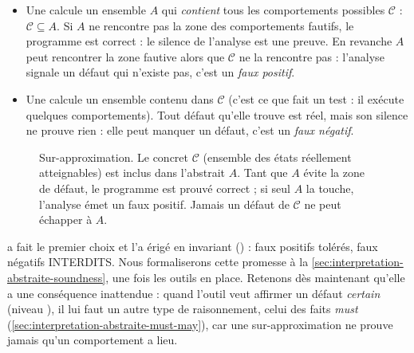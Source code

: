 \begin{itemize}
  \item Une  calcule un ensemble $A$ qui
    \emph{contient} tous les comportements possibles $\mathcal{C}$ :
    $\mathcal{C} \subseteq A$. Si $A$ ne rencontre pas la zone des
    comportements fautifs, le programme est correct : le silence de l'analyse
    est une preuve. En revanche $A$ peut rencontrer la zone fautive alors que
    $\mathcal{C}$ ne la rencontre pas : l'analyse signale un défaut qui n'existe
    pas, c'est un \emph{faux positif}.
  \item Une  calcule un ensemble contenu dans
    $\mathcal{C}$ (c'est ce que fait un test : il exécute quelques
    comportements). Tout défaut qu'elle trouve est réel, mais son silence ne
    prouve rien : elle peut manquer un défaut, c'est un \emph{faux négatif}.
\end{itemize}

\begin{figure}[htbp]\centering
{}
\caption{Sur-approximation. Le concret $\mathcal{C}$ (ensemble des états
réellement atteignables) est inclus dans l'abstrait $A$. Tant que $A$ évite la
zone de défaut, le programme est prouvé correct ; si seul $A$ la touche,
l'analyse émet un faux positif. Jamais un défaut de $\mathcal{C}$ ne peut
échapper à $A$.}
\label{fig:interpretation-abstraite-approx}
\end{figure}

\reactant{} a fait le premier choix et l'a érigé en invariant () :
\og faux positifs tolérés, faux négatifs INTERDITS\fg{}. Nous formaliserons cette
promesse à la \cref{sec:interpretation-abstraite-soundness}, une fois les outils
en place. Retenons dès maintenant qu'elle a une conséquence inattendue : quand
l'outil veut affirmer un défaut \emph{certain} (niveau \Error), il lui faut un
autre type de raisonnement, celui des faits \emph{must}
(\cref{sec:interpretation-abstraite-must-may}), car une sur-approximation ne
prouve jamais qu'un comportement a lieu.

